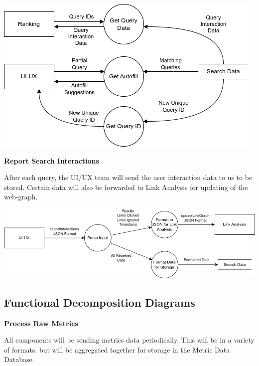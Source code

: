\begin{center}
  \includegraphics[scale=0.5]{DFDs/LowLevelDFDs-ReadSearchData.drawio.png}
\end{center}

\textbf{Report Search Interactions}

\medskip

After each query, the UI/UX team will send the user interaction data to us to be stored. Certain data will also be forwarded to Link Analysis for updating of the web-graph.

\begin{center}
  \includegraphics[scale=0.5]{DFDs/LowLevelDFDs-ReportSearchResults.drawio (2).png}
\end{center}
\subsection*{Functional Decomposition Diagrams}

\textbf{Process Raw Metrics}

\medskip

All components will be sending metrics data periodically. This will be in a variety of formats, but will be aggregated together for storage in the Metric Data Database.

